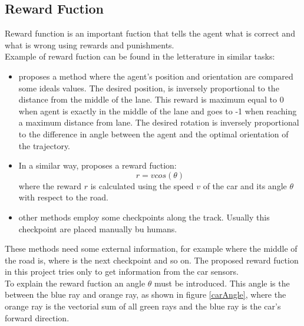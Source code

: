 \documentclass[14pt]{extarticle}
\def\sp{\vspace{5pt}}
\def\pp{\vspace{10pt}\newline}
\begin{document}
\begin{flushleft}
	\subsection{Reward Fuction} \label{rewardfuc}
	\sp
	Reward function is an important fuction that tells the agent what is correct and what is wrong using rewards and punishments. \\
	Example of reward fuction can be found in the letterature in similar tasks:
	\begin{itemize}
	\item \cite{Paper1} proposes a method where the agent's position and orientation are compared some ideals values. The desired position, is inversely proportional to the distance from the middle of the lane. This reward is maximum equal to 0 when agent is exactly in the middle of the lane and goes to -1 when reaching a maximum distance from lane. The desired rotation is inversely proportional to the difference in angle between the agent and the optimal orientation of the trajectory.
	\item In a similar way, \cite{Paper2} proposes a reward fuction:
	\[
	 r = v cos(\theta)
	\]
	where the reward $r$ is calculated using the speed $v$ of the car and its angle $\theta$ with respect to the road.
	\item other methods employ some checkpoints along the track. Usually this checkpoint are placed manually bu humans.
	\end{itemize}
	These methods need some external information, for example where the middle of the road is, where is the next checkpoint and so on.
	\pp 
	The proposed reward fuction in this project tries only to get information from the car sensors. \\
To explain the reward fuction an angle $\theta$ must be introduced. This angle is the between the blue ray and orange ray, as shown in figure \ref{carAngle}, where the orange ray is the vectorial sum of all green rays and the blue ray is the car's forward direction.


\end{flushleft}
\end{document}
